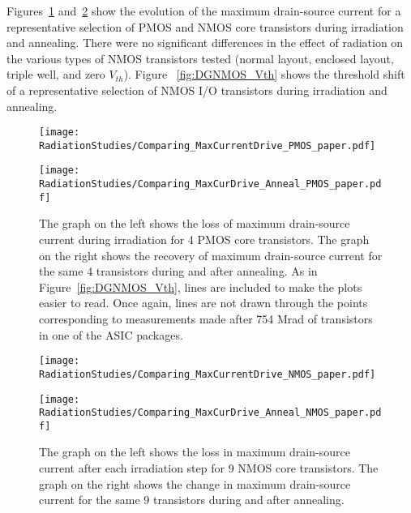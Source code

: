 Figures~\ref{fig:MaxCurDrive_PMOS} and~\ref{fig:MaxCurDrive_NMOS} show the evolution of the maximum drain-source current for a representative selection of PMOS and NMOS core transistors during irradiation and annealing. There were no significant differences in the effect of radiation on the various types of NMOS transistors tested (normal layout, enclosed layout, triple well, and zero $V_{th}$). Figure ~\ref{fig:DGNMOS_Vth} shows the threshold shift of a representative selection of NMOS I/O transistors during irradiation and annealing.

\begin{figure}[h!]
\begin{minipage}[b]{0.5\textwidth}
	\centering
	\texttt{[image: RadiationStudies/Comparing\_MaxCurrentDrive\_PMOS\_paper.pdf]}
\end{minipage}
\hspace{0.5cm}
\begin{minipage}[b]{0.5\textwidth}
	\centering
	\texttt{[image: RadiationStudies/Comparing\_MaxCurDrive\_Anneal\_PMOS\_paper.pdf]}
\end{minipage}
\caption{The graph on the left shows the loss of maximum drain-source current during irradiation for 4 PMOS core transistors. The graph on the right shows the recovery of maximum drain-source current for the same 4 transistors during and after annealing.
As in Figure~\ref{fig:DGNMOS_Vth}, lines are included to make the plots easier to read.
Once again, lines are not drawn through the points corresponding to measurements made after 754 Mrad of transistors in one of the ASIC packages.}
\label{fig:MaxCurDrive_PMOS}
\end{figure}

\begin{figure}[h!]
\begin{minipage}[b]{0.5\textwidth}
	\centering
	\texttt{[image: RadiationStudies/Comparing\_MaxCurrentDrive\_NMOS\_paper.pdf]}
\end{minipage}
\hspace{0.5cm}
\begin{minipage}[b]{0.5\textwidth}
	\centering
	\texttt{[image: RadiationStudies/Comparing\_MaxCurDrive\_Anneal\_NMOS\_paper.pdf]}
\end{minipage}
\caption{The graph on the left shows the loss in maximum drain-source current after each irradiation step for 9 NMOS core transistors. The graph on the right shows the change in maximum drain-source current for the same 9 transistors during and after annealing.}
\label{fig:MaxCurDrive_NMOS}
\end{figure}


